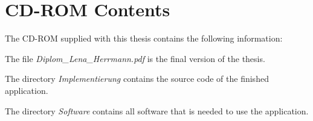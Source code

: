 \section{CD-ROM Contents}

The CD-ROM supplied with this thesis contains the following information:

The file \textit{Diplom\_Lena\_Herrmann.pdf} is the final version of the thesis.

The directory \textit{Implementierung} contains the source code of the finished application.

The directory \textit{Software} contains all software that is needed to use the application.